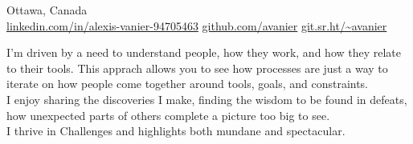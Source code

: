\documentclass[10pt,letterpaper]{article}
\begin{document}
\sloppy  %


\nobreakvspace{0.3em}  %

\noindent{}\EMAIL\sbull
{}\PHONE \sbull Ottawa, Canada
\\
\href{https://www.linkedin.com/in/alexis-vanier-94705463}{linkedin.com/in/alexis-vanier-94705463}\sbull
\href{https://github.com/avanier}{github.com/avanier}\sbull
\href{https://git.sr.ht/~avanier}{git.sr.ht/{\textasciitilde}avanier}

\spacedhrule{0.9em}{-0.4em}  %



\vspace{-0.5em}  %
\begin{multicols}{2}  %
  I'm driven by a need to understand people, how they work, and how they relate to
  their tools. This apprach allows you to see how processes are just a way to
  iterate on how people come together around tools, goals, and constraints.\\

  I enjoy sharing the discoveries I make, finding the wisdom to be found in
  defeats, how unexpected parts of others complete a picture too big to see.\\

  I thrive in Challenges and highlights both mundane and spectacular.\\
\end{multicols}

\spacedhrule{0em}{0em}


\end{document}
